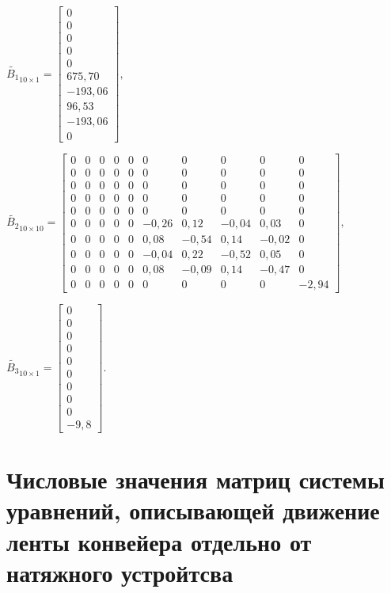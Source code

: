 $
\tilde{B_1}_{10\times1} = 
\begin{bmatrix}
0       \\
0       \\
0       \\
0       \\
0       \\
675,70  \\
-193,06 \\
96,53   \\
-193,06 \\
0
\end{bmatrix},
$
\bigskip

$
\tilde{B_2}_{10\times10} = 
\begin{bmatrix}
0 & 0 & 0 & 0 & 0 & 0     & 0     & 0     & 0     & 0 \\
0 & 0 & 0 & 0 & 0 & 0     & 0     & 0     & 0     & 0 \\
0 & 0 & 0 & 0 & 0 & 0     & 0     & 0     & 0     & 0 \\
0 & 0 & 0 & 0 & 0 & 0     & 0     & 0     & 0     & 0 \\
0 & 0 & 0 & 0 & 0 & 0     & 0     & 0     & 0     & 0 \\
0 & 0 & 0 & 0 & 0 & -0,26 & 0,12  & -0,04 & 0,03  & 0 \\
0 & 0 & 0 & 0 & 0 & 0,08  & -0,54 & 0,14  & -0,02 & 0 \\
0 & 0 & 0 & 0 & 0 & -0,04 & 0,22  & -0,52 & 0,05  & 0 \\
0 & 0 & 0 & 0 & 0 & 0,08  & -0,09 & 0,14  & -0,47 & 0 \\
0 & 0 & 0 & 0 & 0 & 0     & 0     & 0     & 0     & -2,94
\end{bmatrix},
$
\bigskip

$
\tilde{B_3}_{10\times1} = 
\begin{bmatrix}
0       \\
0       \\
0       \\
0       \\
0       \\
0       \\
0       \\
0       \\
0       \\
-9,8    
\end{bmatrix}.
$

\section{Числовые значения матриц системы уравнений, описывающей движение ленты конвейера отдельно от натяжного устройтсва}\label{Appendix13}

